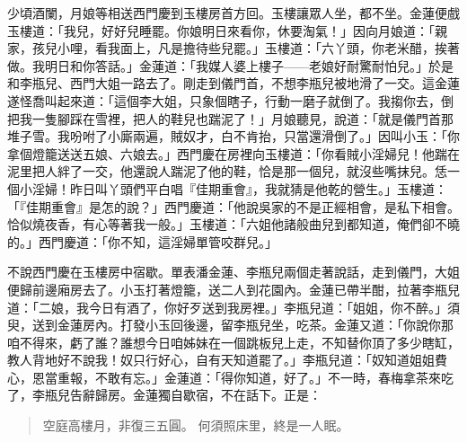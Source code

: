 少頃酒闌，月娘等相送西門慶到玉樓房首方回。玉樓讓眾人坐，都不坐。金蓮便戲玉樓道：「我兒，好好兒睡罷。你娘明日來看你，休要淘氣！」因向月娘道：「親家，孩兒小哩，看我面上，凡是擔待些兒罷。」玉樓道：「六丫頭，你老米醋，挨著做。我明日和你答話。」金蓮道：「我媒人婆上樓子——老娘好耐驚耐怕兒。」於是和李瓶兒、西門大姐一路去了。剛走到儀門首，不想李瓶兒被地滑了一交。這金蓮遂怪喬叫起來道：「這個李大姐，只象個瞎子，行動一磨子就倒了。我搊你去，倒把我一隻腳踩在雪裡，把人的鞋兒也踹泥了！」月娘聽見，說道：「就是儀門首那堆子雪。我吩咐了小廝兩遍，賊奴才，白不肯抬，只當還滑倒了。」因叫小玉：「你拿個燈籠送送五娘、六娘去。」西門慶在房裡向玉樓道：「你看賊小淫婦兒！他踹在泥里把人絆了一交，他還說人踹泥了他的鞋，恰是那一個兒，就沒些嘴抹兒。恁一個小淫婦！昨日叫丫頭們平白唱『佳期重會』，我就猜是他乾的營生。」玉樓道：「『佳期重會』是怎的說？」西門慶道：「他說吳家的不是正經相會，是私下相會。恰似燒夜香，有心等著我一般。」玉樓道：「六姐他諸般曲兒到都知道，俺們卻不曉的。」西門慶道：「你不知，這淫婦單管咬群兒。」

不說西門慶在玉樓房中宿歇。單表潘金蓮、李瓶兒兩個走著說話，走到儀門，大姐便歸前邊廂房去了。小玉打著燈籠，送二人到花園內。金蓮已帶半酣，拉著李瓶兒道：「二娘，我今日有酒了，你好歹送到我房裡。」李瓶兒道：「姐姐，你不醉。」須臾，送到金蓮房內。打發小玉回後邊，留李瓶兒坐，吃茶。金蓮又道：「你說你那咱不得來，虧了誰？誰想今日咱姊妹在一個跳板兒上走，不知替你頂了多少瞎缸，教人背地好不說我！奴只行好心，自有天知道罷了。」李瓶兒道：「奴知道姐姐費心，恩當重報，不敢有忘。」金蓮道：「得你知道，好了。」不一時，春梅拿茶來吃了，李瓶兒告辭歸房。金蓮獨自歇宿，不在話下。正是：
\begin{quote}
空庭高樓月，非復三五圓。
何須照床里，終是一人眠。
\end{quote}
